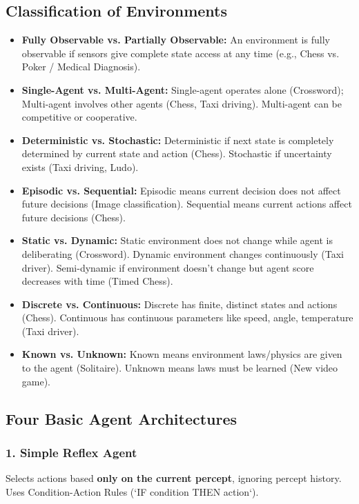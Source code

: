 \documentclass[12pt,a4paper]{article}
\begin{document}
\subsection{Classification of Environments}
\begin{itemize}[leftmargin=*, itemsep=4pt]
  \item \textbf{Fully Observable vs. Partially Observable:} An environment is fully observable if sensors give complete state access at any time (e.g., Chess vs. Poker / Medical Diagnosis).
  \item \textbf{Single-Agent vs. Multi-Agent:} Single-agent operates alone (Crossword); Multi-agent involves other agents (Chess, Taxi driving). Multi-agent can be competitive or cooperative.
  \item \textbf{Deterministic vs. Stochastic:} Deterministic if next state is completely determined by current state and action (Chess). Stochastic if uncertainty exists (Taxi driving, Ludo).
  \item \textbf{Episodic vs. Sequential:} Episodic means current decision does not affect future decisions (Image classification). Sequential means current actions affect future decisions (Chess).
  \item \textbf{Static vs. Dynamic:} Static environment does not change while agent is deliberating (Crossword). Dynamic environment changes continuously (Taxi driver). Semi-dynamic if environment doesn't change but agent score decreases with time (Timed Chess).
  \item \textbf{Discrete vs. Continuous:} Discrete has finite, distinct states and actions (Chess). Continuous has continuous parameters like speed, angle, temperature (Taxi driver).
  \item \textbf{Known vs. Unknown:} Known means environment laws/physics are given to the agent (Solitaire). Unknown means laws must be learned (New video game).
\end{itemize}

\subsection{Four Basic Agent Architectures}

\subsubsection{1. Simple Reflex Agent}
Selects actions based \textbf{only on the current percept}, ignoring percept history. Uses Condition-Action Rules (`IF condition THEN action`).
\end{document}
